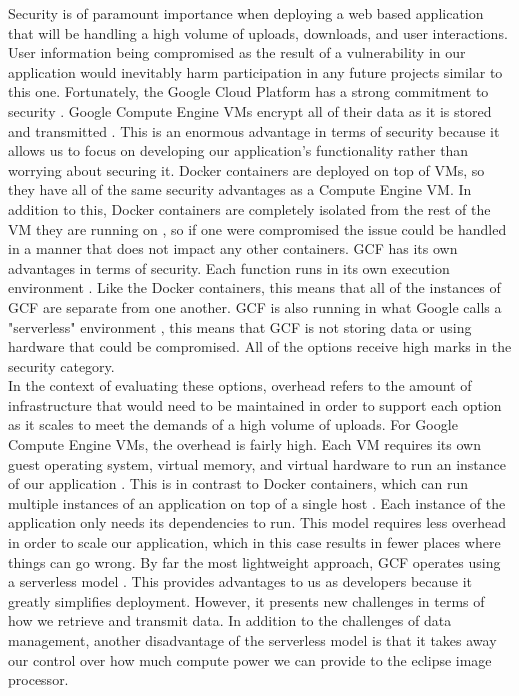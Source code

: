 \documentclass[10pt, onecolumn, draftclsnofoot, letterpaper, compsoc]{IEEEtran}
\begin{document}
Security is of paramount importance when deploying a web based application that
will be handling a high volume of uploads, downloads, and user interactions.
User information being compromised as the result of a vulnerability in our
application would inevitably harm participation in any future projects similar
to this one. Fortunately, the Google Cloud Platform has a strong commitment to
security \cite{gcp}. Google Compute Engine VMs encrypt all of their data as it
is stored and transmitted \cite{gcp}. This is an enormous advantage in terms of
security because it allows us to focus on developing our application's
functionality rather than worrying about securing it. Docker containers are
deployed on top of VMs, so they have all of the same security advantages as a
Compute Engine VM. In addition to this, Docker containers are completely
isolated from the rest of the VM they are running on \cite{docker}, so if one
were compromised the issue could be handled in a manner that does not impact any
other containers. GCF has its own advantages in terms of security. Each function
runs in its own execution environment \cite{docker}. Like the Docker containers,
this means that all of the instances of GCF are separate from one another. GCF
is also running in what Google calls a "serverless" environment \cite{docker},
this means that GCF is not storing data or using hardware that could be
compromised. All of the options receive high marks in the security category. \\

In the context of evaluating these options, overhead refers to the amount of
infrastructure that would need to be maintained in order to support each option
as it scales to meet the demands of a high volume of uploads. For Google Compute
Engine VMs, the overhead is fairly high. Each VM requires its own guest
operating system, virtual memory, and virtual hardware to run an instance of our
application \cite{docker, gcf}. This is in contrast to Docker containers, which
can run multiple instances of an application on top of a single host
\cite{docker}. Each instance of the application only needs its dependencies to
run. This model requires less overhead in order to scale our application, which
in this case results in fewer places where things can go wrong. By far the most
lightweight approach, GCF operates using a serverless model \cite{gcp}. This
provides advantages to us as developers because it greatly simplifies
deployment. However, it presents new challenges in terms of how we retrieve and
transmit data. In addition to the challenges of data management, another
disadvantage of the serverless model is that it takes away our control over how
much compute power we can provide to the eclipse image processor. \\
\end{document}
